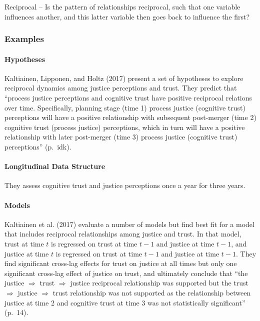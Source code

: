 \documentclass[english,,man]{apa6}
\let\oldparagraph\paragraph
\renewcommand{\paragraph}[1]{\oldparagraph{#1}\mbox{}}
\theoremstyle{definition}
\theoremstyle{definition}
\theoremstyle{definition}
\theoremstyle{remark}
\begin{document}
Reciprocal -- Is the pattern of relationships reciprocal, such that one
variable influences another, and this latter variable then goes back to
influence the first?

\hypertarget{examples-10}{%
\subsubsection{Examples}\label{examples-10}}

\hypertarget{hypotheses-10}{%
\paragraph{Hypotheses}\label{hypotheses-10}}

Kaltiainen, Lipponen, and Holtz (2017) present a set of hypotheses to
explore reciprocal dynamics among justice perceptions and trust. They
predict that \enquote{process justice perceptions and cognitive trust
have positive reciprocal relations over time. Specifically, planning
stage (time 1) process justice (cognitive trust) perceptions will have a
positive relationship with subsequent post-merger (time 2) cognitive
trust (process justice) perceptions, which in turn will have a positive
relationship with later post-merger (time 3) process justice (cognitive
trust) perceptions} (p.~idk).

\hypertarget{longitudinal-data-structure-6}{%
\paragraph{Longitudinal Data
Structure}\label{longitudinal-data-structure-6}}

They assess cognitive trust and justice perceptions once a year for
three years.

\hypertarget{models-10}{%
\paragraph{Models}\label{models-10}}

Kaltiainen et al. (2017) evaluate a number of models but find best fit
for a model that includes reciprocal relationships among justice and
trust. In that model, trust at time \(t\) is regressed on trust at time
\(t-1\) and justice at time \(t-1\), and justice at time \(t\) is
regressed on trust at time \(t-1\) and justice at time \(t-1\). They
find significant cross-lag effects for trust on justice at all times but
only one significant cross-lag effect of justice on trust, and
ultimately conclude that \enquote{the justice \({\Rightarrow}\) trust
\({\Rightarrow}\) justice reciprocal relationship was supported but the
trust \({\Rightarrow}\) justice \({\Rightarrow}\) trust relationship was
not supported as the relationship between justice at time 2 and
cognitive trust at time 3 was not statistically significant} (p.~14).
\end{document}
